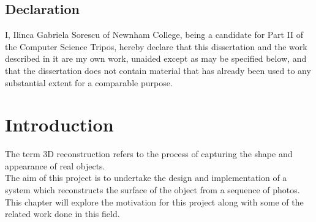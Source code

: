 \documentclass[12pt,a4paper,twoside,openright]{report}
\begin{document}
\newpage
\section*{Declaration}

I, Ilinca Gabriela Sorescu of Newnham College, being a candidate for Part II of the Computer Science Tripos, hereby declare
that this dissertation and the work described in it are my own work,
unaided except as may be specified below, and that the dissertation
does not contain material that has already been used to any substantial
extent for a comparable purpose.

\bigskip
{}

\medskip
{}

\tableofcontents

\listoffigures

\newpage


\pagestyle{headings}

\chapter{Introduction}
The term 3D reconstruction refers to the process of capturing the shape and appearance of real objects.\\
The aim of this project is to undertake the design and implementation of a system which reconstructs the surface of the object from a sequence of photos.\\
\linebreak
This chapter will explore the motivation for this project along with some of the related work done in this field. 
\end{document}
